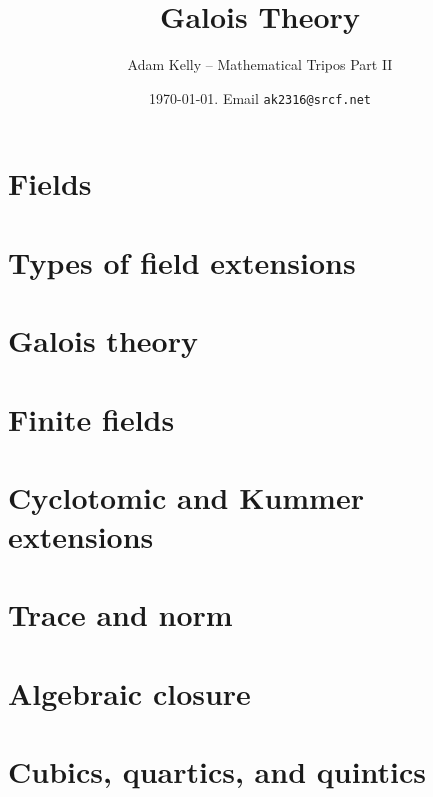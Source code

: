 \documentclass[a4paper, 10pt, twocolumn]{amsart}
\title{Galois Theory}
\author{Adam Kelly -- Mathematical Tripos Part II}
\date{\today. Email \texttt{ak2316@srcf.net}}
\begin{document}
\maketitle

% 
\section{Fields}

\section{Types of field extensions}

\section{Galois theory}

\section{Finite fields}

\section{Cyclotomic and Kummer extensions}

\section{Trace and norm}

\section{Algebraic closure}

\section{Cubics, quartics, and quintics}

\end{document}
